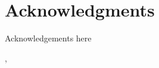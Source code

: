 {}
\chapter*{Acknowledgments}

Acknowledgements here


\vspace{12mm}

\hfill \authorname

\hfill \city, \monthyear
